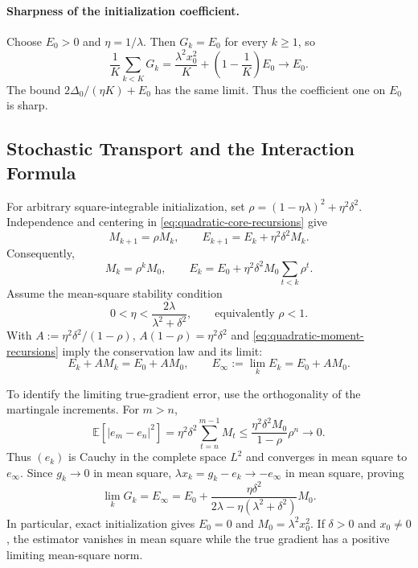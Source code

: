 \paragraph{Sharpness of the initialization coefficient.}
Choose $E_0>0$ and $\eta=1/\lambda$.
Then $G_k=E_0$ for every $k\geq1$, so
\[
\frac1K\sum_{k<K}G_k
=\frac{\lambda^2x_0^2}{K}+\left(1-\frac1K\right)E_0
\longrightarrow E_0.
\]
The bound $2\Delta_0/(\eta K)+E_0$ has the same limit. Thus the
coefficient one on $E_0$ is sharp.

\subsection{Stochastic Transport and the Interaction Formula}
\label{subsec:exact-init-stochastic-transport}
\label{subsec:inexact-init-stochastic-transport}

For arbitrary square-integrable initialization, set
$\rho=(1-\eta\lambda)^2+\eta^2\delta^2$.
Independence and centering in \eqref{eq:quadratic-core-recursions} give
\begin{equation}
\label{eq:quadratic-moment-recursions}
M_{k+1}=\rho M_k,\qquad E_{k+1}=E_k+\eta^2\delta^2M_k.
\end{equation}
Consequently,
\[
M_k=\rho^kM_0,\qquad
E_k=E_0+\eta^2\delta^2M_0\sum_{t<k}\rho^t.
\]
Assume the mean-square stability condition
\begin{equation}
\label{eq:quadratic-stability}
0<\eta<\frac{2\lambda}{\lambda^2+\delta^2},
\qquad\text{equivalently }\rho<1.
\end{equation}
With $A:=\eta^2\delta^2/(1-\rho)$,
$A(1-\rho)=\eta^2\delta^2$ and \eqref{eq:quadratic-moment-recursions}
imply the conservation law and its limit:
\begin{equation}
\label{eq:quadratic-conservation}
E_k+AM_k=E_0+AM_0,\qquad
E_\infty:=\lim_kE_k=E_0+AM_0.
\end{equation}

To identify the limiting true-gradient error, use the orthogonality
of the martingale increments. For $m>n$,
\[
\mathbb E[|e_m-e_n|^2]
=\eta^2\delta^2\sum_{t=n}^{m-1}M_t
\leq\frac{\eta^2\delta^2M_0}{1-\rho}\rho^n\to0.
\]
Thus $(e_k)$ is Cauchy in the complete space $L^2$ and converges in
mean square to $e_\infty$. Since $g_k\to0$ in mean square,
$\lambda x_k=g_k-e_k\to-e_\infty$ in mean square, proving
\begin{equation}
\label{eq:quadratic-interaction}
\boxed{\lim_kG_k=E_\infty
=E_0+\frac{\eta\delta^2}{2\lambda-\eta(\lambda^2+\delta^2)}M_0.}
\end{equation}
In particular, exact initialization gives $E_0=0$ and
$M_0=\lambda^2x_0^2$. If $\delta>0$ and $x_0\ne0$, the estimator
vanishes in mean square while the true gradient has a positive
limiting mean-square norm.

